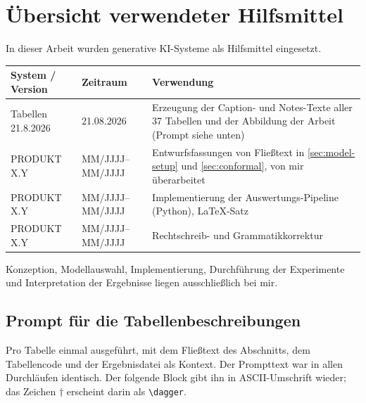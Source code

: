 \section*{Übersicht verwendeter Hilfsmittel}
\label{app:hilfsmittel}

In dieser Arbeit wurden generative KI-Systeme als Hilfsmittel eingesetzt.

\begin{tabular}{@{}p{3.2cm}p{2.4cm}p{8cm}@{}}
\toprule
\textbf{System / Version} & \textbf{Zeitraum} & \textbf{Verwendung} \\
\midrule
Tabellen 21.8.2026 & 21.08.2026 & Erzeugung der Caption- und Notes-Texte aller
  37 Tabellen und der Abbildung der Arbeit (Prompt siehe unten) \\
PRODUKT X.Y & MM/JJJJ--MM/JJJJ & Entwurfsfassungen von Fließtext in
  \cref{sec:model-setup} und \cref{sec:conformal}, von mir überarbeitet \\
PRODUKT X.Y & MM/JJJJ--MM/JJJJ & Implementierung der Auswertungs-Pipeline
  (Python), \LaTeX-Satz \\
PRODUKT X.Y & MM/JJJJ--MM/JJJJ & Rechtschreib- und Grammatikkorrektur \\
\bottomrule
\end{tabular}

\bigskip
\noindent
Konzeption, Modellauswahl, Implementierung, Durchführung der Experimente und
Interpretation der Ergebnisse liegen ausschließlich bei mir.

\subsection*{Prompt für die Tabellenbeschreibungen}

Pro Tabelle einmal ausgeführt, mit dem Fließtext des Abschnitts, dem
Tabellencode und der Ergebnisdatei als Kontext. Der Prompttext war in allen
Durchläufen identisch. Der folgende Block gibt ihn in ASCII-Umschrift wieder;
das Zeichen $\dagger$ erscheint darin als \verb|\dagger|.

